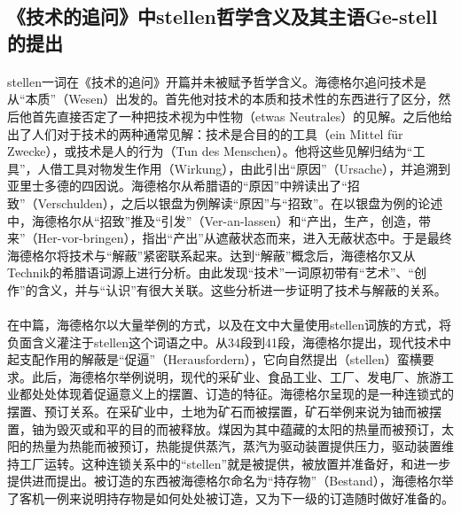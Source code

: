 \documentclass{article}
\begin{document}
	\subsection{《技术的追问》中stellen哲学含义及其主语Ge-stell的提出}
		\paragraph{}
		stellen一词在《技术的追问》开篇并未被赋予哲学含义。海德格尔追问技术是从“本质”（Wesen）出发的。首先他对技术的本质和技术性的东西进行了区分，然后他首先直接否定了一种把技术视为中性物（etwas Neutrales）的见解。之后他给出了人们对于技术的两种通常见解：技术是合目的的工具（ein Mittel für Zwecke），或技术是人的行为（Tun des Menschen）。他将这些见解归结为“工具”，人借工具对物发生作用（Wirkung），由此引出“原因”（Ursache），并追溯到亚里士多德的四因说。海德格尔从希腊语的“原因”中辨读出了“招致”（Verschulden），之后以银盘为例解读“原因”与“招致”。在以银盘为例的论述中，海德格尔从“招致”推及“引发”（Ver-an-lassen）和“产出，生产，创造，带来”（Her-vor-bringen），指出“产出”从遮蔽状态而来，进入无蔽状态中。于是最终海德格尔将技术与“解蔽”紧密联系起来。达到“解蔽”概念后，海德格尔又从Technik的希腊语词源上进行分析。由此发现“技术”一词原初带有“艺术”、“创作”的含义，并与“认识”有很大关联。这些分析进一步证明了技术与解蔽的关系。
		\paragraph{}
		在中篇，海德格尔以大量举例的方式，以及在文中大量使用stellen词族的方式，将负面含义灌注于stellen这个词语之中。从34段到41段，海德格尔提出，现代技术中起支配作用的解蔽是“促逼”（Herausfordern），它向自然提出（stellen）蛮横要求。此后，海德格尔举例说明，现代的采矿业、食品工业、工厂、发电厂、旅游工业都处处体现着促逼意义上的摆置、订造的特征。海德格尔呈现的是一种连锁式的摆置、预订关系。在采矿业中，土地为矿石而被摆置，矿石举例来说为铀而被摆置，铀为毁灭或和平的目的而被释放。煤因为其中蕴藏的太阳的热量而被预订，太阳的热量为热能而被预订，热能提供蒸汽，蒸汽为驱动装置提供压力，驱动装置维持工厂运转。这种连锁关系中的“stellen”就是被提供，被放置并准备好，和进一步提供进而提出。被订造的东西被海德格尔命名为“持存物”（Bestand），海德格尔举了客机一例来说明持存物是如何处处被订造，又为下一级的订造随时做好准备的。
\end{document}

